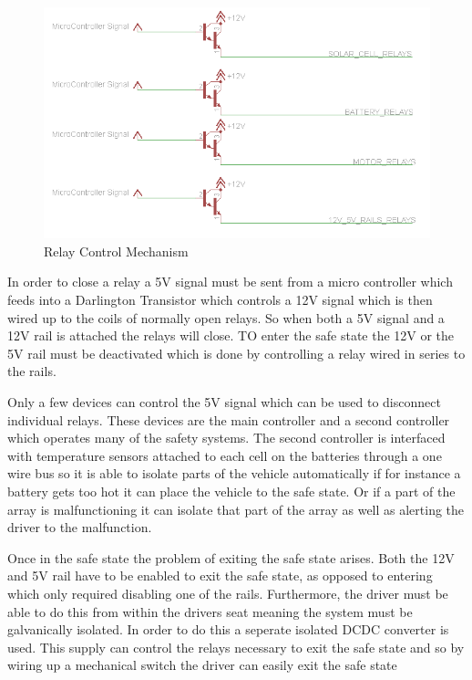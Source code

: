 \documentclass[10pt,a4paper]{article}
\begin{document}
\begin{figure}[H]
\includegraphics[width=\columnwidth]{RelayControl.png}%
\caption{Relay Control Mechanism}
\label{Fig:RelayControl}
\end{figure}

In order to close a relay a 5V signal must be sent from a micro controller which feeds into a Darlington Transistor which controls a 12V signal which is then wired up to the coils of normally open relays. So when both a 5V signal and a 12V rail is attached the relays will close. TO enter the safe state the 12V or the 5V rail must be deactivated which is done by controlling a relay wired in series to the rails.

Only a few devices can control the 5V signal which can be used to disconnect individual relays. These devices are the main controller and a second controller which operates many of the safety systems. The second controller is interfaced with temperature sensors attached to each cell on the batteries through a one wire bus so it is able to isolate parts of the vehicle automatically if for instance a battery gets too hot it can place the vehicle to the safe state. Or if a part of the array is malfunctioning it can isolate that part of the array as well as alerting the driver to the malfunction.

Once in the safe state the problem of exiting the safe state arises. Both the 12V and 5V rail have to be enabled to exit the safe state, as opposed to entering which only required disabling one of the rails. Furthermore, the driver must be able to do this from within the drivers seat meaning the system must be galvanically isolated. In order to do this a seperate isolated DCDC converter is used. This supply can control the relays necessary to exit the safe state and so by wiring up a mechanical switch the driver can easily exit the safe state
\end{document}
